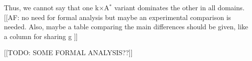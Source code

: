 \documentclass[twoside,11pt]{article}
\newcommand{\kxastar}{k$\times$A$^*$\xspace}
\begin{document}
Thus, we cannot say that one \kxastar variant dominates the other in all domains. [[AF: no need for formal analysis but maybe an experimental comparison is needed. Also, maybe a table comparing the main differences should be given, like a column for sharing g ]]

[[TODO: SOME FORMAL ANALYSIS??]]







\vskip 0.2in


\end{document}
